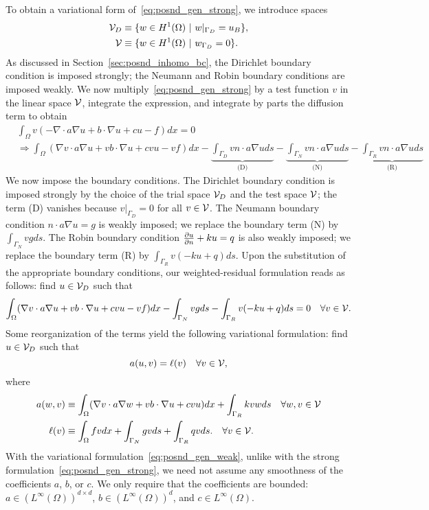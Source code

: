 To obtain a variational form of~\eqref{eq:posnd_gen_strong}, we introduce spaces
\begin{align*}
  \mathcal{V}_D &\equiv \{ w \in H^1(\Omega) \ | \ w|_{\Gamma_D} = u_B \}, \\
  \mathcal{V} &\equiv \{ w \in H^1(\Omega) \ | \ w_{\Gamma_D} = 0 \}.
\end{align*}
As discussed in Section~\ref{sec:posnd_inhomo_bc}, the Dirichlet boundary condition is imposed strongly; the Neumann and Robin boundary conditions are imposed weakly.  We now multiply~\eqref{eq:posnd_gen_strong} by a test function $v$ in the linear space $\mathcal{V}$, integrate the expression, and integrate by parts the diffusion term to obtain
\begin{align*}
  &\int_\Omega v (- \nabla \cdot a \nabla u + b \cdot \nabla u + c u - f) dx = 0 \\
  & \Rightarrow
  \int_\Omega (\nabla v \cdot a \nabla u  + v b \cdot \nabla u + c vu -vf ) dx
  -  \underbrace{\int_{\Gamma_D} v n \cdot a \nabla u ds}_{\text{(D)}}
  - \underbrace{\int_{\Gamma_N} v n \cdot a \nabla u ds}_{\text{(N)}}
  - \underbrace{\int_{\Gamma_R} v n \cdot a \nabla u ds}_{\text{(R)}}
\end{align*}
We now impose the boundary conditions.  The Dirichlet boundary condition is imposed strongly by the choice of the trial space $\mathcal{V}_D$ and the test space $\mathcal{V}$; the term (D) vanishes because $v|_{\Gamma_D} = 0$ for all $v \in \mathcal{V}$.  The Neumann boundary condition $n \cdot a \nabla u = g$ is weakly imposed; we replace the boundary term (N) by $\int_{\Gamma_N} v g ds$.  The Robin boundary condition $\frac{\partial u}{\partial n} + k u = q$ is also weakly imposed; we replace the boundary term (R) by $\int_{\Gamma_R} v (-ku + q) ds$.  Upon the substitution of the appropriate boundary conditions, our weighted-residual formulation reads as follows: find $u \in \mathcal{V}_D$ such that
\begin{equation*}
  \int_\Omega (\nabla v \cdot a \nabla u  + v b \cdot \nabla u + c vu - vf) dx
  - \int_{\Gamma_N} v g ds - \int_{\Gamma_R} v (-ku + q) ds = 0
  \quad \forall v \in \mathcal{V}.
\end{equation*}
Some reorganization of the terms yield the following variational formulation: find $u \in \mathcal{V}_D$ such that
\begin{equation}
  a(u,v) = \ell(v) \quad \forall v \in \mathcal{V},
  \label{eq:posnd_gen_weak}
\end{equation}
where
\begin{align*}
  a(w,v) &\equiv \int_\Omega (\nabla v \cdot a \nabla w + v b \cdot \nabla u + c vu ) dx + \int_{\Gamma_R} k vw ds \quad \forall w, v \in \mathcal{V} \\
  \ell(v) &\equiv \int_\Omega fv dx + \int_{\Gamma_N} gv ds + \int_{\Gamma_R} qv ds.
  \quad \forall v \in \mathcal{V}.
\end{align*}
With the variational formulation~\eqref{eq:posnd_gen_weak}, unlike with the strong formulation~\eqref{eq:posnd_gen_strong}, we need not assume any smoothness of the coefficients $a$, $b$, or $c$.  We only require that the coefficients are bounded: $a \in (L^\infty(\Omega))^{d \times d}$, $b \in (L^\infty(\Omega))^d$, and $c \in L^\infty(\Omega)$.

